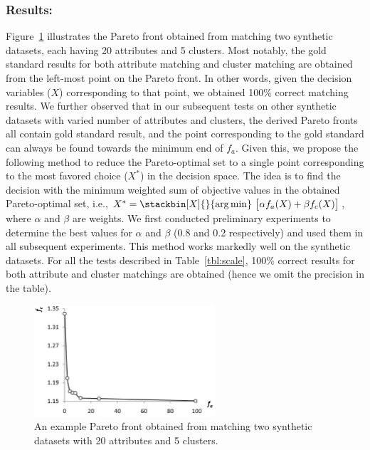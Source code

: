 \subsubsection{Results:}
Figure~\ref{fig:syn_pareto} illustrates the Pareto front obtained from matching two synthetic datasets, each having 20 attributes and 5 clusters. Most notably, the gold standard results for both attribute matching and cluster matching are obtained from the left-most point on the Pareto front. In other words, given the decision variables ($X$) corresponding to that point, we obtained 100\% correct matching results. We further observed that in our subsequent tests on other synthetic datasets with varied number of attributes and clusters, the derived Pareto fronts all contain gold standard result, and the point corresponding to the gold standard can always be found towards the minimum end of $f_a$. Given this, we propose the following method to reduce the Pareto-optimal set to a single point corresponding to the most favored choice ($X^*$) in the decision space. The idea is to find the decision with the minimum weighted sum of objective values in the obtained Pareto-optimal set, i.e., $X^*=\stackbin[X]{}{\argmin}~\big[\alpha f_a(X)+\beta f_c(X)\big]$, where $\alpha$ and $\beta$ are weights. We first conducted preliminary experiments to determine the best values for $\alpha$ and $\beta$ (0.8 and 0.2 respectively) and used them in all subsequent experiments. This method works markedly well on the synthetic datasets. For all the tests described in Table~\ref{tbl:scale}, 100\% correct results for both attribute and cluster matchings are obtained (hence we omit the precision in the table).
\begin{figure}[tb]
\begin{center}
\includegraphics[width=0.6\textwidth]{fig/syn_pareto.eps}
\end{center}
\caption{\label{fig:syn_pareto} An example Pareto front obtained from matching two synthetic datasets with 20 attributes and 5 clusters.}
\end{figure}

